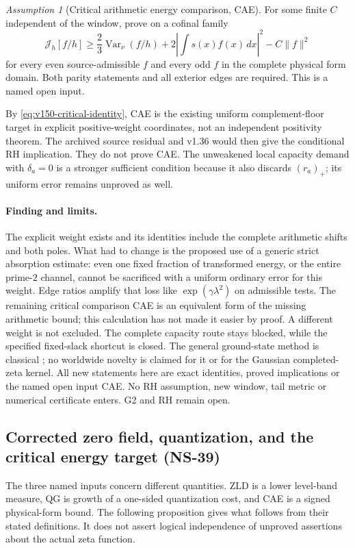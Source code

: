 \documentclass[11pt]{article}
\theoremstyle{remark}
\newtheorem{assumption}[theorem]{Assumption}
\begin{document}
\begin{assumption}[Critical arithmetic energy comparison, CAE]
\label{ass:v150-cae}
For some finite $C$ independent of the window, prove on a cofinal family
\begin{equation}\label{eq:v150-cae}
 \mathcal J_h[f/h]\ge
 \frac23\operatorname{Var}_{\nu}(f/h)
       +2\left|\int s(x)f(x)\,dx\right|^2-C\|f\|^2
\end{equation}
for every even source-admissible $f$ and every odd $f$ in the complete
physical form domain. Both parity statements and all exterior edges
are required. This is a named open input.
\end{assumption}
By \eqref{eq:v150-critical-identity}, CAE is the existing uniform
complement-floor target in explicit positive-weight coordinates, not
an independent positivity theorem. The archived source residual and
v1.36 would then give the conditional RH implication. They do not
prove CAE. The unweakened local capacity demand with $\delta_a=0$
is a stronger sufficient condition because it also discards $(r_a)_+$;
its uniform error remains unproved as well.

\paragraph{Finding and limits.}
The explicit weight exists and its identities include the complete
arithmetic shifts and both poles. What had to change is the proposed
use of a generic strict absorption estimate: even one fixed fraction
of transformed energy, or the entire prime-$2$ channel, cannot be
sacrificed with a uniform ordinary error for this weight. Edge ratios
amplify that loss like $\exp(\gamma\lambda^2)$ on admissible tests.
The remaining critical comparison CAE is an equivalent form of the
missing arithmetic bound; this calculation has not made it easier
by proof. A different weight is not excluded. The complete capacity
route stays blocked, while the specified fixed-slack shortcut is closed.
The general ground-state method is classical
\cite{FrankSeiringer2008}; no worldwide novelty is claimed for it or
for the Gaussian completed-zeta kernel. All new statements here are
exact identities, proved implications or the named open input CAE.
No RH assumption, new window, tail metric or numerical certificate
enters. G2 and RH remain open.

\subsection*{Corrected zero field, quantization, and the critical energy target (NS-39)}
\label{sec:v151-input-comparison}
The three named inputs concern different quantities. ZLD is a lower
level-band measure, QG is growth of a one-sided quantization cost, and
CAE is a signed physical-form bound. The following proposition gives
what follows from their stated definitions. It does not assert logical
independence of unproved assertions about the actual zeta function.
\end{document}
